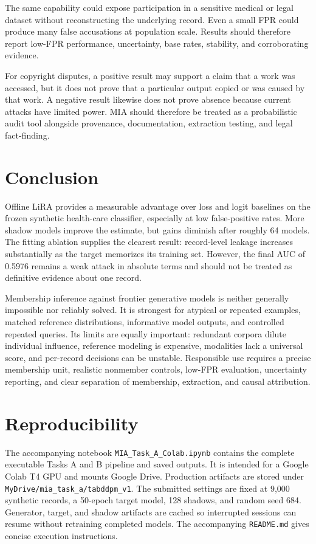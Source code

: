 \documentclass[11pt]{article}
\begin{document}
The same capability could expose participation in a sensitive medical or legal dataset
without reconstructing the underlying record. Even a small FPR could produce many false
accusations at population scale. Results should therefore report low-FPR performance,
uncertainty, base rates, stability, and corroborating evidence.

For copyright disputes, a positive result may support a claim that a work was accessed,
but it does not prove that a particular output copied or was caused by that work. A
negative result likewise does not prove absence because current attacks have limited
power. MIA should therefore be treated as a probabilistic audit tool alongside provenance,
documentation, extraction testing, and legal fact-finding.

\section{Conclusion}

Offline LiRA provides a measurable advantage over loss and logit baselines on the frozen
synthetic health-care classifier, especially at low false-positive rates. More shadow
models improve the estimate, but gains diminish after roughly 64 models. The fitting
ablation supplies the clearest result: record-level leakage increases substantially as the
target memorizes its training set. However, the final AUC of 0.5976 remains a weak attack
in absolute terms and should not be treated as definitive evidence about one record.

Membership inference against frontier generative models is neither generally impossible
nor reliably solved. It is strongest for atypical or repeated examples, matched reference
distributions, informative model outputs, and controlled repeated queries. Its limits are
equally important: redundant corpora dilute individual influence, reference modeling is
expensive, modalities lack a universal score, and per-record decisions can be unstable.
Responsible use requires a precise membership unit, realistic nonmember controls, low-FPR
evaluation, uncertainty reporting, and clear separation of membership, extraction, and
causal attribution.

\appendix
\section{Reproducibility}

The accompanying notebook \texttt{MIA\_Task\_A\_Colab.ipynb} contains the complete
executable Tasks A and B pipeline and saved outputs. It is intended for a Google Colab T4
GPU and mounts Google Drive. Production artifacts are stored under
\texttt{MyDrive/mia\_task\_a/tabddpm\_v1}. The submitted settings are fixed at 9,000
synthetic records, a 50-epoch target model, 128 shadows, and random seed 684. Generator,
target, and shadow
artifacts are cached so interrupted sessions can resume without retraining completed
models. The accompanying \texttt{README.md} gives concise execution instructions.
\end{document}
